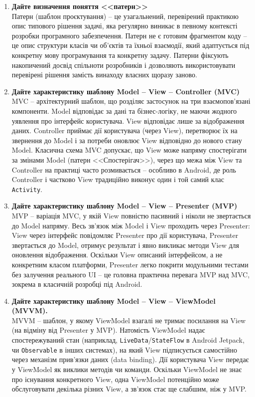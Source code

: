 \documentclass[14pt, a4paper]{extreport}
\begin{document}
	\begin{enumerate}
		\item \textbf{Дайте визначення поняття <<патерн>>} \\ Патерн (шаблон проєктування) -- це узагальнений, перевірений практикою опис типового рішення задачі, яка регулярно виникає в певному контексті розробки програмного забезпечення. Патерн не є готовим фрагментом коду -- це опис структури класів чи об'єктів та їхньої взаємодії, який адаптується під конкретну мову програмування та конкретну задачу. Патерни фіксують накопичений досвід спільноти розробників і дозволяють використовувати перевірені рішення замість винаходу власних щоразу заново.

		\item \textbf{Дайте характеристику шаблону Model -- View -- Controller (MVC)} \\ MVC -- архітектурний шаблон, що розділяє застосунок на три взаємопов'язані компоненти. Model відповідає за дані та бізнес-логіку, не маючи жодного уявлення про інтерфейс користувача. View відповідає лише за відображення даних. Controller приймає дії користувача (через View), перетворює їх на звернення до Model і за потреби оновлює View відповідно до нового стану Model. Класична схема MVC допускає, що View може напряму спостерігати за змінами Model (патерн <<Спостерігач>>), через що межа між View та Controller на практиці часто розмивається -- особливо в Android, де роль Controller і частково View традиційно виконує один і той самий клас \texttt{Activity}.

		\item \textbf{Дайте характеристику шаблону Model -- View -- Presenter (MVP)} \\ MVP -- варіація MVC, у якій View повністю пасивний і ніколи не звертається до Model напряму. Весь зв'язок між Model і View проходить через Presenter: View через інтерфейс повідомляє Presenter про дії користувача, Presenter звертається до Model, отримує результат і явно викликає методи View для оновлення відображення. Оскільки View описаний інтерфейсом, а не конкретним класом платформи, Presenter легко покрити модульними тестами без залучення реального UI -- це головна практична перевага MVP над MVC, зокрема в класичній розробці під Android.

		\item \textbf{Дайте характеристику шаблону Model -- View -- ViewModel (MVVM).} \\ MVVM -- шаблон, у якому ViewModel взагалі не тримає посилання на View (на відміну від Presenter у MVP). Натомість ViewModel надає спостережуваний стан (наприклад, \texttt{LiveData}/\texttt{StateFlow} в Android Jetpack, чи \texttt{Observable} в інших системах), на який View підписується самостійно через механізм прив'язки даних (data binding). Дії користувача View передає у ViewModel як виклики методів чи команди. Оскільки ViewModel не знає про існування конкретного View, одна ViewModel потенційно може обслуговувати декілька різних View, а зв'язок стає ще слабшим, ніж у MVP.


\end{enumerate}
\end{document}
